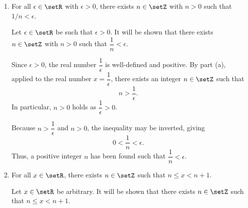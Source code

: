 \begin{enumerate}
\begin{enumerate}
\begin{subprove}
      For the sake of contradiction, suppose that the set of integers $\setZ$ is bounded from above.
      Then, by the completeness axiom, the nonempty set $\setZ$ has a least upper bound; denote it by $s = \sup \setZ$.
    
      Consider the real number $s - 1$. Since $s - 1 < s$, the number $s - 1$ cannot be an upper bound of $\setZ$.
      Hence, by the definition of upper bound, there exists an integer $m \in \setZ$ such that
      \[
        m > s - 1.
      \]
      Since $s$ is an upper bound of $\setZ$, it follows that $m \leq s$.
      Therefore,
      \[
        s - 1 < m \leq s.
      \]
      Now consider $m + 1$. Since $m \in \setZ$, it follows that $m + 1 \in \setZ$.
      Moreover,
      \[
        m + 1 > s.
      \]
      This contradicts the fact that $s$ is an upper bound of $\setZ$, because an element of $\setZ$ has been found that is greater than $s$.
    
      Therefore, the assumption that $\setZ$ is bounded from above must be false.
      It follows that $\setZ$ is not bounded from above.
      By the definition of being unbounded above, for any real number $x \in \setR$, there exists an integer $n \in \setZ$ such that $n > x$.
    \end{subprove}
    
    \item For all $\epsilon \in \setR$ with $\epsilon>0$, there exists $n \in \setZ$ with $n>0$ such that $1 / n<\epsilon$.
    \begin{subprove}
      Let $\epsilon \in \setR$ be such that $\epsilon > 0$.
      It will be shown that there exists $n \in \setZ$ with $n > 0$ such that $\dfrac{1}{n} < \epsilon$.
    
      Since $\epsilon > 0$, the real number $\dfrac{1}{\epsilon}$ is well-defined and positive.
      By part (a), applied to the real number $x = \dfrac{1}{\epsilon}$, there exists an integer $n \in \setZ$ such that
      \[
        n > \frac{1}{\epsilon}.
      \]
      In particular, $n > 0$ holds as $\dfrac{1}{\epsilon} > 0$.
    
      Because $n > \dfrac{1}{\epsilon}$ and $n > 0$, the inequality may be inverted, giving
      \[
        0 < \frac{1}{n} < \epsilon.
      \]
      Thus, a positive integer $n$ has been found such that $\dfrac{1}{n} < \epsilon$.
    \end{subprove}
    
    \item For all $x \in \setR$, there exists $n \in \setZ$ such that $n \leq x<n+1$.
    \begin{subprove}
      Let $x \in \setR$ be arbitrary.
      It will be shown that there exists $n \in \setZ$ such that $n \leq x < n + 1$.
    

\end{subprove}
\end{enumerate}
\end{enumerate}
